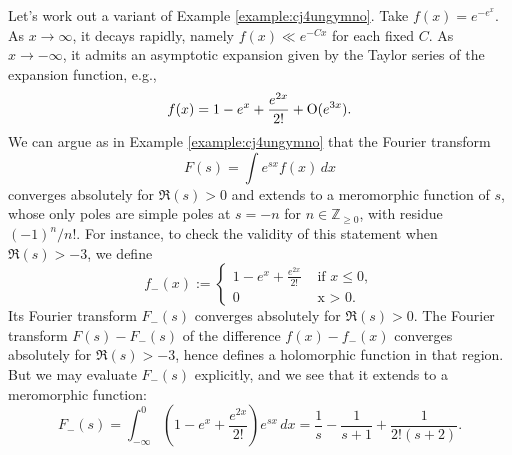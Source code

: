 \documentclass[reqno]{amsart} 
\begin{document}
\begin{example}\label{example:cj4uniw25n}
  Let's work out a variant of Example \ref{example:cj4ungymno}.  Take $f(x) = e^{- e^x}$.  As $x \rightarrow \infty$, it decays rapidly, namely $f(x) \ll e^{-C x}$ for each fixed $C$.  As $x \rightarrow -\infty$, it admits an asymptotic expansion given by the Taylor series of the expansion function, e.g.,
  \begin{equation*}
f(x) = 1 - e^{x} + \frac{e^{2 x}}{2!} + \operatorname{O} (e^{3 x}).
  \end{equation*}
  We can argue as in Example \ref{example:cj4ungymno} that the Fourier transform
  \begin{equation*}
F(s) = \int e^{s x } f(x) \, d x
  \end{equation*}
  converges absolutely for $\Re(s) > 0$ and extends to a meromorphic function of $s$, whose only poles are simple poles at $s = -n$ for $n \in \mathbb{Z}_{\geq 0}$, with residue $(-1)^n / n!$.  For instance, to check the validity of this statement when $\Re(s) > -3$, we define
  \begin{equation*}
f_-(x) :=
\begin{cases}
1 - e^x + \frac{e^{2 x }}{ 2 !} & \text{ if } x \leq 0, \\
0 & \text{ x > 0.}
\end{cases}
  \end{equation*}
  Its Fourier transform $F_-(s)$ converges absolutely for $\Re(s) > 0$.  The Fourier transform $F(s) - F_-(s)$ of the difference $f(x) - f_-(x)$ converges absolutely for $\Re(s) > -3$, hence defines a holomorphic function in that region.  But we may evaluate $F_-(s)$ explicitly, and we see that it extends to a meromorphic function:
  \begin{equation}\label{eq:cj4uni5pkc}
    F_-(s) = \int _{-\infty}^0 \left( 1 - e^x + \frac{e^{2 x }}{ 2!} \right) e^{s x} \, d x
    =
    \frac{1}{s} - \frac{1}{s + 1} + \frac{1}{2 ! (s + 2)}.
\end{equation}  
\end{example}
\end{document}
